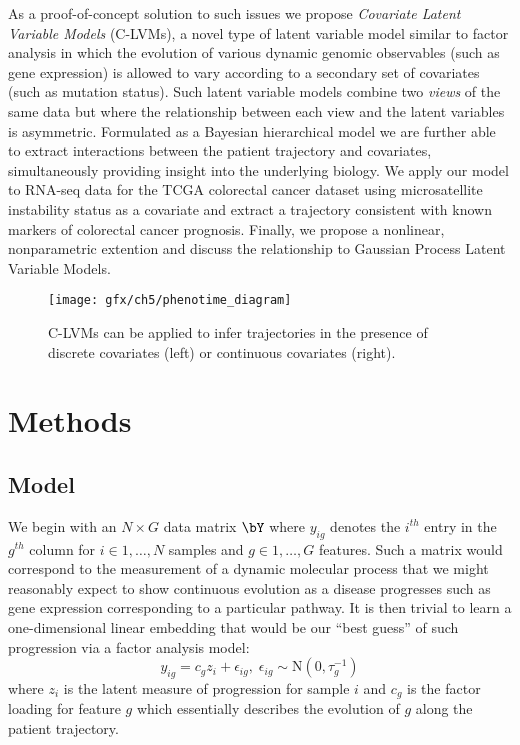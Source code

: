 As a proof-of-concept solution to such issues we propose \emph{Covariate Latent Variable Models} (C-LVMs), a novel type of latent variable model similar to factor analysis in which the evolution of various dynamic genomic observables (such as gene expression) is allowed to vary according to a secondary set of covariates (such as mutation status). Such latent variable models combine two \emph{views} of the same data but where the relationship between each view and the latent variables is asymmetric. Formulated as a Bayesian hierarchical model we are further able to extract interactions between the patient trajectory and covariates, simultaneously providing insight into the underlying biology. We apply our model to RNA-seq data for the TCGA colorectal cancer dataset using microsatellite instability status as a covariate and extract a trajectory consistent with known markers of colorectal cancer prognosis. Finally, we propose a nonlinear, nonparametric extention and discuss the relationship to Gaussian Process Latent Variable Models.

\begin{figure}[h]
  \centering
  \texttt{[image: gfx/ch5/phenotime\_diagram]}
  \caption{C-LVMs can be applied to infer trajectories in the presence of discrete covariates (left) or continuous covariates (right).}
 \label{fig:phenotime}
\end{figure}

\section{Methods}

\subsection{Model}

We begin with an $N \times G$ data matrix $\bY$ where $y_{ig}$ denotes the $i^{th}$ entry in the $g^{th}$ column for $i \in 1, \ldots, N$ samples and $g \in 1, \ldots, G$ features. Such a matrix would correspond to the measurement of a dynamic molecular process that we might reasonably expect to show continuous evolution as a disease progresses such as gene expression corresponding to a particular pathway. It is then trivial to learn a one-dimensional linear embedding that would be our ``best guess'' of such progression via a factor analysis model:
\begin{equation}
	y_{ig} = c_g z_i + \epsilon_{ig},  \; \epsilon_{ig} \sim \mathrm{N}(0,\tau_g^{-1})
\end{equation}
where $z_i$ is the latent measure of progression for sample $i$ and $c_g$ is the factor loading for feature $g$ which essentially describes the evolution of $g$ along the patient trajectory.

